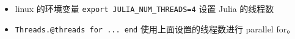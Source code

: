 
\begin{issues}
\issueDraft
\end{issues}

\begin{itemize}
\item linux 的环境变量 \verb|export JULIA_NUM_THREADS=4| 设置 Julia 的线程数
\item \verb|Threads.@threads for ... end| 使用上面设置的线程数进行 parallel for。
\end{itemize}
